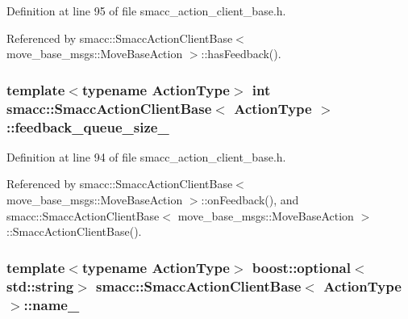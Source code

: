 Definition at line 95 of file smacc\+\_\+action\+\_\+client\+\_\+base.\+h.



Referenced by smacc\+::\+Smacc\+Action\+Client\+Base$<$ move\+\_\+base\+\_\+msgs\+::\+Move\+Base\+Action $>$\+::has\+Feedback().

\subsubsection[{\texorpdfstring{feedback\+\_\+queue\+\_\+size\+\_\+}{feedback_queue_size_}}]{\setlength{\rightskip}{0pt plus 5cm}template$<$typename Action\+Type$>$ {\bf int} {\bf smacc\+::\+Smacc\+Action\+Client\+Base}$<$ Action\+Type $>$\+::feedback\+\_\+queue\+\_\+size\+\_\+\hspace{0.3cm}{\ttfamily [protected]}}\hypertarget{classsmacc_1_1SmaccActionClientBase_a834575fe2be93d0ccada8c1d486c49cd}{}\label{classsmacc_1_1SmaccActionClientBase_a834575fe2be93d0ccada8c1d486c49cd}


Definition at line 94 of file smacc\+\_\+action\+\_\+client\+\_\+base.\+h.



Referenced by smacc\+::\+Smacc\+Action\+Client\+Base$<$ move\+\_\+base\+\_\+msgs\+::\+Move\+Base\+Action $>$\+::on\+Feedback(), and smacc\+::\+Smacc\+Action\+Client\+Base$<$ move\+\_\+base\+\_\+msgs\+::\+Move\+Base\+Action $>$\+::\+Smacc\+Action\+Client\+Base().

\subsubsection[{\texorpdfstring{name\+\_\+}{name_}}]{\setlength{\rightskip}{0pt plus 5cm}template$<$typename Action\+Type$>$ boost\+::optional$<$std\+::string$>$ {\bf smacc\+::\+Smacc\+Action\+Client\+Base}$<$ Action\+Type $>$\+::name\+\_\+}\hypertarget{classsmacc_1_1SmaccActionClientBase_a8464e3ec514e57333339fc538a2203f4}{}\label{classsmacc_1_1SmaccActionClientBase_a8464e3ec514e57333339fc538a2203f4}


